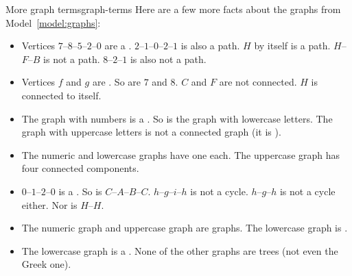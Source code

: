 \documentclass{tufte-handout}
\begin{document}
\newpage
\begin{model*}{More graph terms}{graph-terms}
Here are a few more facts about the graphs from
Model~\ref{model:graphs}:

\begin{itemize}
\item Vertices $7$--$8$--$5$--$2$--$0$ are a .
  $2$--$1$--$0$--$2$--$1$ is also a path.  $H$ by itself is a
  path. $H$--$F$--$B$ is not a path.  $8$--$2$--$1$ is also not a path.
\item Vertices $f$ and $g$ are .  So are $7$ and $8$.
  $C$ and $F$ are not connected.  $H$ is connected to itself.
\item The graph with numbers is a .  So is the
  graph with lowercase letters.  The graph with uppercase letters is
  not a connected graph (it is ).
\item The numeric and lowercase graphs have one  each.  The uppercase graph has four connected
  components.
\item $0$--$1$--$2$--$0$ is a .  So is $C$--$A$--$B$--$C$.
  $h$--$g$--$i$--$h$ is not a cycle.  $h$--$g$--$h$ is not a cycle
  either.  Nor is $H$--$H$.
\item The numeric graph and uppercase graph are  graphs.
  The lowercase graph is .
\item The lowercase graph is a .  None of the other graphs
  are trees (not even the Greek one).
\end{itemize}
\end{model*}
\end{document}
